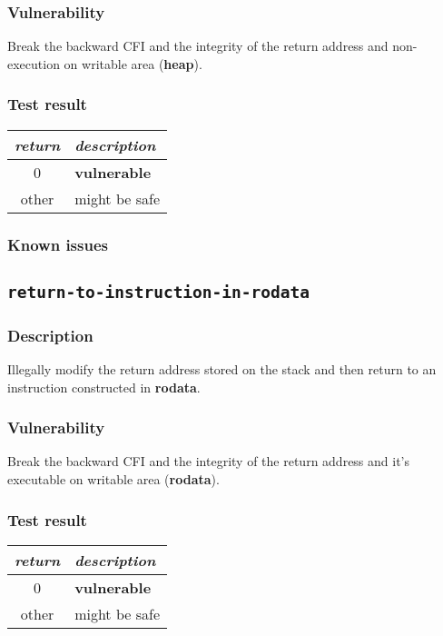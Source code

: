 \documentclass[a4paper]{book}
\begin{document}
\subsubsection{Vulnerability}
Break the backward CFI and the integrity of the return address and non-execution on writable area (\textbf{heap}).

\subsubsection{Test result}
\begin{tabular}{cl}
  \toprule
  \emph{return}  & \emph{description} \\
  \midrule
  0              & \textbf{vulnerable} \\
  other          & might be safe \\
  \bottomrule
\end{tabular}
  
\subsubsection{Known issues}

\newpage
\subsection{\texttt{return-to-instruction-in-rodata}}\label{test-return-to-instruction-in-rodata}

\subsubsection{Description}
Illegally modify the return address stored on the stack and then return to  an instruction constructed in \textbf{rodata}.

\subsubsection{Vulnerability}
Break the backward CFI and the integrity of the return address and it’s  executable on writable area (\textbf{rodata}).

\subsubsection{Test result}
\begin{tabular}{cl}
  \toprule
  \emph{return}  & \emph{description} \\
  \midrule
  0              & \textbf{vulnerable} \\
  other          & might be safe \\
  \bottomrule
\end{tabular}
  
\end{document}

